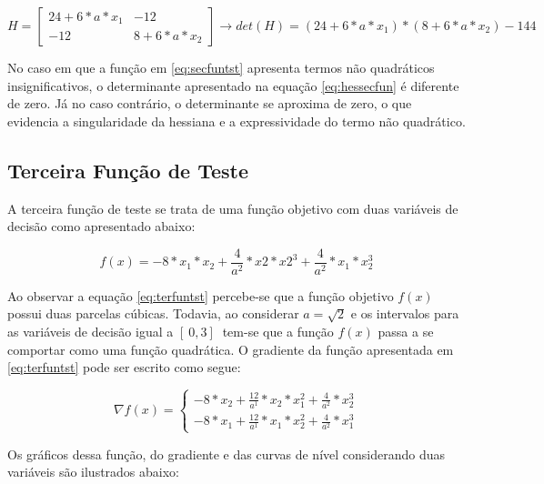 \begin{equation}\label{eq:hessecfun}
    H = \begin{bmatrix}
                    24+6*a*x_1 & -12 \\
                    -12 & 8+6*a*x_2
                \end{bmatrix} \rightarrow det(H) = (24+6*a*x_1)*(8+6*a*x_2)-144   
\end{equation}

No caso em que a função em \ref{eq:secfuntst}  apresenta termos não quadráticos insignificativos, o determinante apresentado na equação \ref{eq:hessecfun} é diferente de zero. Já no caso contrário, o determinante se aproxima de zero, o que evidencia a singularidade da hessiana e a expressividade do termo não quadrático.

\subsection{Terceira Função de Teste}\label{sec:terfun}

A terceira função de teste se trata de uma função objetivo com duas variáveis de decisão como apresentado abaixo:

\begin{equation}\label{eq:terfuntst}
    f(x)=-8*x_1*x_2+\frac{4}{a^2}*x2*x2^3+\frac{4}{a^2}*x_1*x_2^3
\end{equation}

Ao observar a equação \ref{eq:terfuntst} percebe-se que a função objetivo $f(x)$ possui duas parcelas cúbicas. Todavia, ao considerar $a=\sqrt{2}$ e os intervalos para as variáveis de decisão igual a $[\ 0 , 3 ]\ $ tem-se  que a função $f(x)$ passa a se comportar como uma função quadrática. O gradiente da função apresentada em \ref{eq:terfuntst} pode ser escrito como segue:

\begin{equation}\label{eq:gradterfuntst}
    \nabla f(x) = \begin{cases}
         -8*x_2+\frac{12}{a^1}*x_2*x_1^2+\frac{4}{a^2}*x_2^3\\
         -8*x_1+\frac{12}{a^1}*x_1*x_2^2+\frac{4}{a^2}*x_1^3
    \end{cases}
\end{equation} 
   	   
Os gráficos dessa função, do gradiente e das curvas de nível considerando duas variáveis são ilustrados abaixo:

